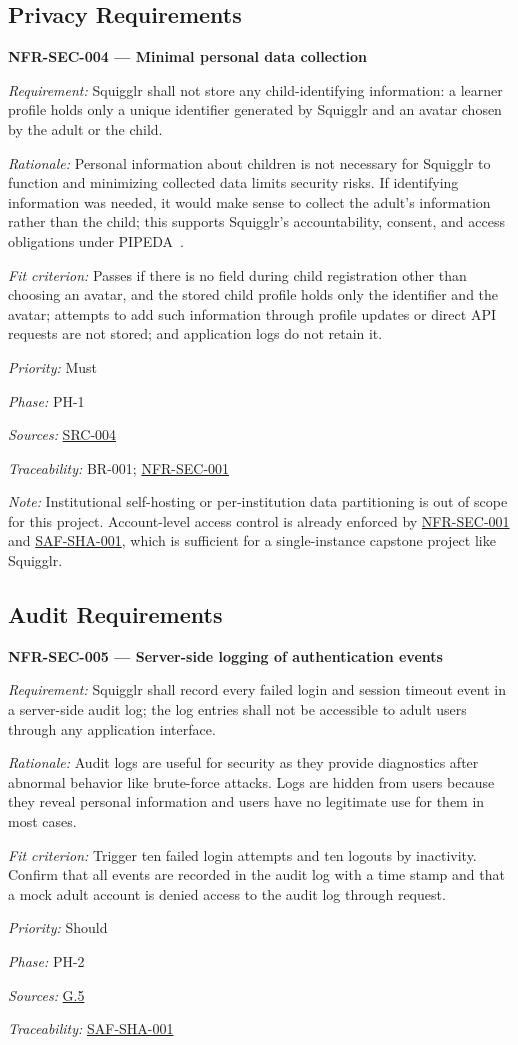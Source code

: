 \documentclass[12pt]{article}
\renewcommand{\_}{\textunderscore\allowbreak}%
\newcommand{\goalref}[1]{\hyperref[goal:#1]{G.#1}}
\newenvironment{srsrequirement}[2]{%
  \par\medskip\noindent\phantomsection\label{req:#1}%
  \textbf{#1 --- #2}\par\nobreak\smallskip }{\par\medskip}
\newcommand{\reqfield}[2]{\noindent\textit{#1:} #2\par}
\newcommand{\reqshall}[1]{\reqfield{Requirement}{#1}}
\newcommand{\reqrationale}[1]{\reqfield{Rationale}{#1}}
\newcommand{\reqfit}[1]{\reqfield{Fit criterion}{#1}}
\newcommand{\reqpriority}[1]{\reqfield{Priority}{#1}}
\newcommand{\reqphase}[1]{\reqfield{Phase}{#1}}
\newcommand{\reqsources}[1]{\reqfield{Sources}{#1}}
\newcommand{\reqtraces}[1]{\reqfield{Traceability}{#1}}
\newcommand{\reqref}[1]{\hyperref[req:#1]{#1}}
\newcommand{\srcref}[1]{\hyperref[src:#1]{SRC-#1}}
\begin{document}
\subsection{Privacy Requirements}

\begin{srsrequirement}{NFR-SEC-004}{Minimal personal data collection}
  \reqshall{Squigglr shall not store any child-identifying information: a
learner profile holds only a unique identifier generated by Squigglr and an
avatar chosen by the adult or the child.} \reqrationale{Personal
information about children is not necessary for Squigglr to function and
minimizing collected data limits security risks. If identifying information was
needed, it would make sense to collect the adult's information rather than the
child; this supports Squigglr's accountability, consent, and access obligations
under PIPEDA~\cite{pipeda}.} \reqfit{Passes if there is no field during child
registration other than choosing an avatar, and the stored child profile
holds only the identifier and the avatar; attempts to add such information 
through profile updates or direct API requests are not stored; and application 
logs do not retain it.}
  \reqpriority{Must}
  \reqphase{PH-1}
  \reqsources{\srcref{004}} \reqtraces{BR-001; \reqref{NFR-SEC-001}}
\end{srsrequirement}

\emph{Note:} Institutional self-hosting or per-institution data partitioning is
out of scope for this project. Account-level access control is already enforced
by \reqref{NFR-SEC-001} and \reqref{SAF-SHA-001}, which is sufficient for a
single-instance capstone project like Squigglr.

\subsection{Audit Requirements}

\begin{srsrequirement}{NFR-SEC-005}{Server-side logging of authentication events}
  \reqshall{Squigglr shall record every failed login and session timeout event
in a server-side audit log; the log entries shall not be accessible to adult
users through any application interface.} \reqrationale{Audit logs are useful
for security as they provide diagnostics after abnormal behavior like
brute-force attacks. Logs are hidden from users because they reveal personal
information and users have no legitimate use for them in most cases.}
\reqfit{Trigger ten failed login attempts and ten logouts by inactivity. Confirm
that all events are recorded in the audit log with a time stamp and that a mock
adult account is denied access to the audit log through request.}
  \reqpriority{Should}
  \reqphase{PH-2}
  \reqsources{\goalref{5}} \reqtraces{\reqref{SAF-SHA-001}}
\end{srsrequirement}
\end{document}
